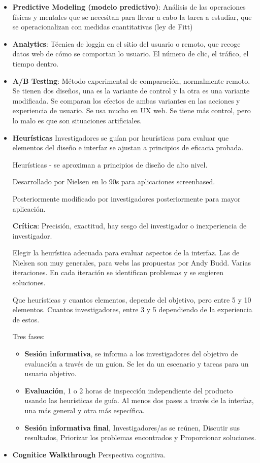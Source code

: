 \documentclass[12pt, twoside, openright]{report} %
\begin{document}
\begin{itemize}
	\item \textbf{Predictive Modeling (modelo predictivo)}: Análisis de las operaciones físicas y mentales que se necesitan para llevar a cabo la tarea a estudiar, que se operacionalizan con medidas cuantitativas (ley de Fitt)
	\item \textbf{Analytics}: Técnica de loggin en el sitio del usuario o remoto, que recoge datos web de cómo se comportan lo usuario. El número de clic, el tráfico, el tiempo dentro.
	\item \textbf{A/B Testing}: Método experimental de comparación, normalmente remoto. Se tienen dos diseños, una es la variante de control y la otra es una variante modificada. Se comparan los efectos de ambas variantes en las acciones y experiencia de usuario. Se usa mucho en UX web. Se tiene más control, pero lo malo es que son situaciones artificiales.
	\item \textbf{Heurísticas}
	      Investigadores se guían por heurísticas para evaluar que elementos del diseño e interfaz se ajustan a principios de eficacia probada.

	      Heurísticas - se aproximan a principios de diseño de alto nivel.

	      Desarrollado por Nielsen en lo 90s para aplicaciones screenbased.

	      Posteriormente modificado por investigadores posteriormente para mayor aplicación.

	      \textbf{Crítica}: Precisión, exactitud, hay sesgo del investigador o inexperiencia de investigador.

	      Elegir la heurística adecuada para evaluar aspectos de la interfaz. Las de Nielsen son muy generales, para webs las propuestas por Andy Budd. Varias iteraciones. En cada iteración se identifican problemas y se sugieren soluciones.

	      Que heurísticas y cuantos elementos, depende del objetivo, pero entre 5 y 10 elementos. Cuantos investigadores, entre 3 y 5 dependiendo de la experiencia de estos.

	      Tres fases:
	      \begin{itemize}
		      \item \textbf{Sesión informativa}, se informa a los investigadores del objetivo de evaluación a través de un guion. Se les da un escenario y tareas para un usuario objetivo.
		      \item \textbf{Evaluación}, 1 o 2 horas de inspección independiente del producto usando las heurísticas de guía. Al menos dos pases a través de la interfaz, una más general y otra más específica.
		      \item \textbf{Sesión informativa final}, Investigadores/as se reúnen, Discutir sus resultados, Priorizar los problemas encontrados y Proporcionar soluciones.
	      \end{itemize}
	\item \textbf{Cognitice Walkthrough}
	      Perspectiva cognitiva.


\end{itemize}
\end{document}
